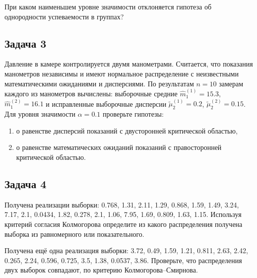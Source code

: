 \documentclass[a4paper,12pt]{article}
\newif\ifsolutions
\begin{document}
При каком наименьшем уровне значимости отклоняется гипотеза об однородности успеваемости в группах?

\ifsolutions Решение: \par
    $n = 100$, оценки $\widehat{\theta} \approx (0.29, 0.1, 0.36, 0.25)$, статистика $X^2 = 3277124.138$, уровень значимости 0.
\fi

\subsection*{Задача 3 \cite[230]{Efimov}}

Давление в камере контролируется двумя манометрами. Считается, что показания манометров независимы и имеют нормальное распределение с неизвестными
математическими ожиданиями и дисперсиями. По результатам $n = 10$ замерам каждого из манометров вычислены: выборочные средние
$\widehat{m}_1^{(1)} = 15.3$, $\widehat{m}_1^{(2)} = 16.1$ и исправленные выборочные дисперсии $\widetilde{\mu}_{2}^{(1)} = 0.2$,
$\widetilde{\mu}_{2}^{(2)} = 0.15$. Для уровня значимости $\alpha = 0.1$ проверьте гипотезы:
\begin{enumerate}
    \item о равенстве дисперсий показаний с двусторонней критической областью,
    \item о равенстве математических ожиданий показаний с правосторонней критической областью.
\end{enumerate}
\ifsolutions Решение: \par
    \begin{enumerate}
        \item Статистика 1.(3), критическая область $(-\infty, 0.31457) \cup (3.17889, \infty)$, гипотеза принимается.
        \item Статистика -4.27618, критическая область $(-\infty, -1.72913) \cup (1.72913, \infty)$, гипотеза отклоняется.
    \end{enumerate}
\fi

\subsection*{Задача 4}

Получена реализации выборки: 0.768, 1.31, 2.11, 1.29, 0.868, 1.59, 1.49, 3.24, 7.17, 2.1, 0.0434, 1.82, 0.278, 2.1, 1.06, 7.95, 1.69, 0.809, 1.63, 1.15.
Используя критерий согласия Колмогорова определите из какого распределения получена выборка из равномерного или показательного.

Получена ещё одна реализация выборки: 3.72, 0.49, 1.59, 1.21, 0.811, 2.63, 2.42, 0.265, 2.24, 0.596, 0.725, 3.5, 1.38, 0.0537, 3.86.
Проверьте, что распределения двух выборок совпадают, по критерию Колмогорова--Смирнова.
\end{document}
